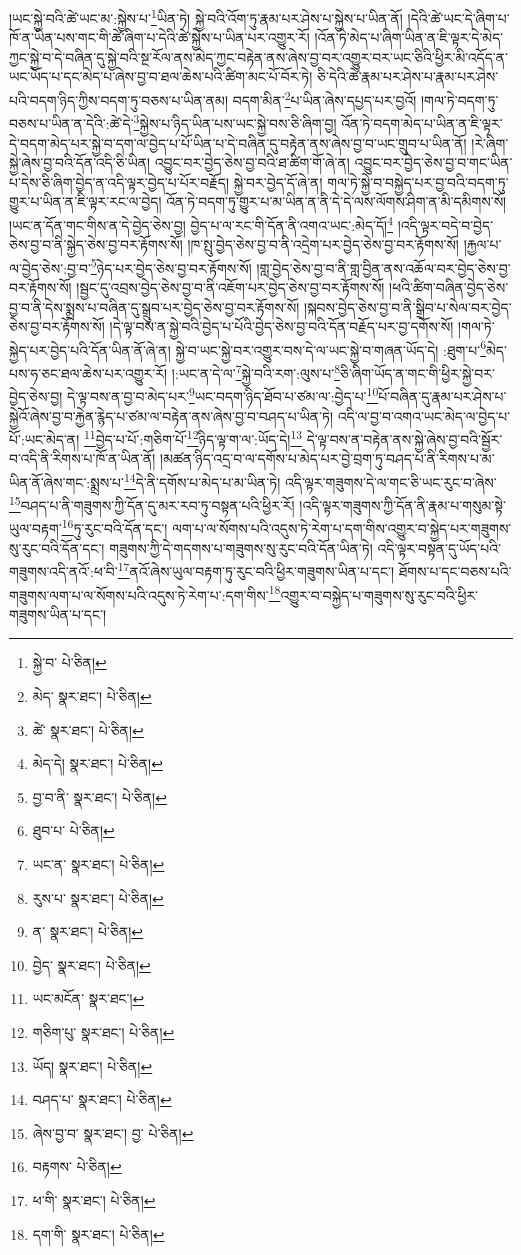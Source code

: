 །ཡང་སྐྱེ་བའི་ཚེ་ཡང་མ་:སྐྱེས་པ་\footnote{སྐྱེ་བ་  པེ་ཅིན། }ཡིན་ཏེ། སྐྱེ་བའི་འོག་ཏུ་རྣམ་པར་ཤེས་པ་སྐྱེས་པ་ཡིན་ནོ། །དེའི་ཚེ་ཡང་དེ་ཞིག་པ་ཁོ་ན་ཡིན་པས་གང་གི་ཚེ་ཞིག་པ་དེའི་ཚེ་སྐྱེས་པ་ཡིན་པར་འགྱུར་རོ། །འོན་ཏེ་མེད་པ་ཞིག་ཡིན་ན་ཇི་ལྟར་དེ་མེད་ཀྱང་སྐྱེ་བ་དེ་བཞིན་དུ་སྐྱེ་བའི་སྔ་རོལ་ནས་མེད་ཀྱང་བརྟེན་ནས་ཞེས་བྱ་བར་འགྱུར་བར་ཡང་ཅིའི་ཕྱིར་མི་འདོད་ན་ཡང་ཡོད་པ་དང་མེད་པ་ཞེས་བྱ་བ་ཐལ་ཆེས་པའི་ཚིག་མང་པོ་བོར་ཏེ། ཅི་དེའི་ཚེ་རྣམ་པར་ཤེས་པ་རྣམ་པར་ཤེས་པའི་བདག་ཉིད་ཀྱིས་བདག་ཏུ་བཅས་པ་ཡིན་ནམ། བདག་མིན་\footnote{མེད་  སྣར་ཐང་།  པེ་ཅིན། }པ་ཡིན་ཞེས་དཔྱད་པར་བྱའོ། །གལ་ཏེ་བདག་ཏུ་བཅས་པ་ཡིན་ན་དེའི་:ཚེ་དེ་\footnote{ཚེ་  སྣར་ཐང་།  པེ་ཅིན། }སྐྱེས་པ་ཉིད་ཡིན་པས་ཡང་སྐྱེ་བས་ཅི་ཞིག་བྱ། འོན་ཏེ་བདག་མེད་པ་ཡིན་ན་ཇི་ལྟར་དེ་བདག་མེད་པར་སྐྱེ་བ་དག་ལ་བྱེད་པ་པོ་ཡིན་པ་དེ་བཞིན་དུ་བརྟེན་ནས་ཞེས་བྱ་བ་ཡང་གྲུབ་པ་ཡིན་ནོ། །རེ་ཞིག་སྐྱེ་ཞེས་བྱ་བའི་དོན་འདི་ཅི་ཡིན། འབྱུང་བར་བྱེད་ཅེས་བྱ་བའི་ཐ་ཚིག་གོ་ཞེ་ན། འབྱུང་བར་བྱེད་ཅེས་བྱ་བ་གང་ཡིན་པ་དེས་ཅི་ཞིག་བྱེད་ན་འདི་ལྟར་བྱེད་པ་པོར་བརྗོད། སྐྱེ་བར་བྱེད་དོ་ཞེ་ན། གལ་ཏེ་སྐྱེ་བ་བསྐྱེད་པར་བྱ་བའི་བདག་ཏུ་གྱུར་པ་ཡིན་ན་ཇི་ལྟར་རང་ལ་བྱེད། འོན་ཏེ་བདག་ཏུ་གྱུར་པ་མ་ཡིན་ན་ནི་དེ་དེ་ལས་ལོགས་ཤིག་ན་མི་དམིགས་སོ། །ཡང་ན་དོན་གང་གིས་ན་དེ་བྱེད་ཅེས་བྱ། བྱེད་པ་ལ་རང་གི་དོན་ནི་འགའ་ཡང་:མེད་དོ།\footnote{མེད་དེ།  སྣར་ཐང་།  པེ་ཅིན། } །འདི་ལྟར་བདེ་བ་བྱེད་ཅེས་བྱ་བ་ནི་སྐྱེད་ཅེས་བྱ་བར་རྟོགས་སོ། །ཁ་སྤུ་བྱེད་ཅེས་བྱ་བ་ནི་འདྲེག་པར་བྱེད་ཅེས་བྱ་བར་རྟོགས་སོ། །རྐྱལ་པ་ལ་བྱེད་ཅེས་:བྱ་བ་\footnote{བྱ་བ་ནི་  སྣར་ཐང་།  པེ་ཅིན། }ཉེད་པར་བྱེད་ཅེས་བྱ་བར་རྟོགས་སོ། །གླ་བྱེད་ཅེས་བྱ་བ་ནི་གླ་བྱིན་ནས་འཆོལ་བར་བྱེད་ཅེས་བྱ་བར་རྟོགས་སོ། །སྦྱང་དུ་འབྲས་བྱེད་ཅེས་བྱ་བ་ནི་འཇོག་པར་བྱེད་ཅེས་བྱ་བར་རྟོགས་སོ། །ཕའི་ཚིག་བཞིན་བྱེད་ཅེས་བྱ་བ་ནི་དེས་སྨྲས་པ་བཞིན་དུ་སྒྲུབ་པར་བྱེད་ཅེས་བྱ་བར་རྟོགས་སོ། །སྐབས་བྱེད་ཅེས་བྱ་བ་ནི་སྒྲིབ་པ་སེལ་བར་བྱེད་ཅེས་བྱ་བར་རྟོགས་སོ། །དེ་ལྟ་བས་ན་སྐྱེ་བའི་བྱེད་པ་པོའི་བྱེད་ཅེས་བྱ་བའི་དོན་བརྗོད་པར་བྱ་དགོས་སོ། །གལ་ཏེ་སྐྱེད་པར་བྱེད་པའི་དོན་ཡིན་ནོ་ཞེ་ན། སྐྱེ་བ་ཡང་སྐྱེ་བར་འགྱུར་བས་དེ་ལ་ཡང་སྐྱེ་བ་གཞན་ཡོད་དེ། :ཐུག་པ་\footnote{ཐུབ་པ་  པེ་ཅིན། }མེད་པས་ཧ་ཅང་ཐལ་ཆེས་པར་འགྱུར་རོ། །:ཡང་ན་དེ་ལ་\footnote{ཡང་ན་  སྣར་ཐང་།  པེ་ཅིན། }སྐྱེ་བའི་རག་:ལུས་པ་\footnote{རུས་པ་  སྣར་ཐང་།  པེ་ཅིན། }ཅི་ཞིག་ཡོད་ན་གང་གི་ཕྱིར་སྐྱེ་བར་བྱེད་ཅེས་བྱ། དེ་ལྟ་བས་ན་བྱ་བ་མེད་པར་\footnote{ན་  སྣར་ཐང་།  པེ་ཅིན། }ཡང་བདག་ཉིད་ཐོབ་པ་ཙམ་ལ་:བྱེད་པ་\footnote{བྱེད་  སྣར་ཐང་།  པེ་ཅིན། }པོ་བཞིན་དུ་རྣམ་པར་ཤེས་པ་སྐྱེའོ་ཞེས་བྱ་བ་རྐྱེན་རྙེད་པ་ཙམ་ལ་བརྟེན་ནས་ཞེས་བྱ་བ་བཤད་པ་ཡིན་ཏེ། འདི་ལ་བྱ་བ་འགའ་ཡང་མེད་ལ་བྱེད་པ་པོ་:ཡང་མེད་ན། \footnote{ཡང་མངོན་  སྣར་ཐང་། }བྱེད་པ་པོ་:གཅིག་པོ་\footnote{གཅིག་པུ་  སྣར་ཐང་།  པེ་ཅིན། }ཉིད་ལྟ་ག་ལ་:ཡོད་དེ།\footnote{ཡོད།  སྣར་ཐང་།  པེ་ཅིན། } དེ་ལྟ་བས་ན་བརྟེན་ནས་སྐྱེ་ཞེས་བྱ་བའི་སྦྱོར་བ་འདི་ནི་རིགས་པ་ཁོ་ན་ཡིན་ནོ། །མཚན་ཉིད་འདྲ་བ་ལ་དགོས་པ་མེད་པར་བྱེ་བྲག་ཏུ་བཤད་པ་ནི་རིགས་པ་མ་ཡིན་ནོ་ཞེས་གང་:སྨྲས་པ་\footnote{བཤད་པ་  སྣར་ཐང་།  པེ་ཅིན། }དེ་ནི་དགོས་པ་མེད་པ་མ་ཡིན་ཏེ། འདི་ལྟར་གཟུགས་དེ་ལ་གང་ཅི་ཡང་རུང་བ་ཞེས་\footnote{ཞེས་བྱ་བ་  སྣར་ཐང་། བྱ་  པེ་ཅིན། }བཤད་པ་ནི་གཟུགས་ཀྱི་དོན་དུ་མར་རབ་ཏུ་བསྟན་པའི་ཕྱིར་རོ། །འདི་ལྟར་གཟུགས་ཀྱི་དོན་ནི་རྣམ་པ་གསུམ་སྟེ་ཡུལ་བརྟག་\footnote{བརྟགས་  པེ་ཅིན། }ཏུ་རུང་བའི་དོན་དང་། ལག་པ་ལ་སོགས་པའི་འདུས་ཏེ་རེག་པ་དག་གིས་འགྱུར་བ་སྐྱེད་པར་གཟུགས་སུ་རུང་བའི་དོན་དང་། གཟུགས་ཀྱི་དེ་གདགས་པ་གཟུགས་སུ་རུང་བའི་དོན་ཡིན་ཏེ། འདི་ལྟར་བསྟན་དུ་ཡོད་པའི་གཟུགས་འདི་ནའོ་:ཕ་བི་\footnote{ཕ་གི་  སྣར་ཐང་།  པེ་ཅིན། }ནའོ་ཞེས་ཡུལ་བརྟག་ཏུ་རུང་བའི་ཕྱིར་གཟུགས་ཡིན་པ་དང་། ཐོགས་པ་དང་བཅས་པའི་གཟུགས་ལག་པ་ལ་སོགས་པའི་འདུས་ཏེ་རེག་པ་:དག་གིས་\footnote{དག་གི་  སྣར་ཐང་།  པེ་ཅིན། }འགྱུར་བ་བསྐྱེད་པ་གཟུགས་སུ་རུང་བའི་ཕྱིར་གཟུགས་ཡིན་པ་དང་། 